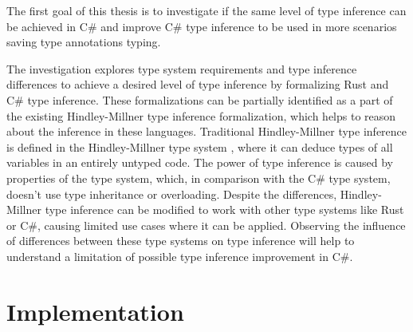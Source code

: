 The first goal of this thesis is to investigate if the same level of type inference can be achieved in C\# and improve C\# type inference to be used in more scenarios saving type annotations typing.
\par
The investigation explores type system requirements and type inference differences to achieve a desired level of type inference by formalizing Rust and C\# type inference.
These formalizations can be partially identified as a part of the existing Hindley-Millner \cite{online:yHM} type inference formalization, which helps to reason about the inference in these languages.
Traditional Hindley-Millner type inference is defined in the Hindley-Millner type system \cite{online:wikiHM}, where it can deduce types of all variables in an entirely untyped code. 
The power of type inference is caused by properties of the type system, which, in comparison with the C\# type system, doesn't use type inheritance or overloading. 
Despite the differences, Hindley-Millner type inference can be modified to work with other type systems like Rust or C\#, causing limited use cases where it can be applied.
Observing the influence of differences between these type systems on type inference will help to understand a limitation of possible type inference improvement in C\#.

\section{Implementation}

